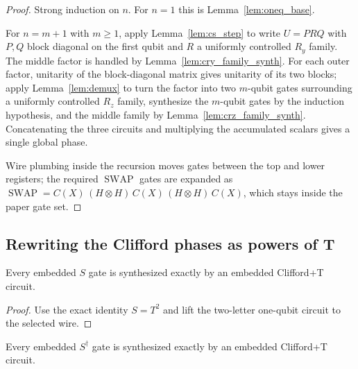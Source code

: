 \begin{proof}
  \leanok
  Strong induction on $n$.  For $n = 1$ this is Lemma~\ref{lem:oneq_base}.

  For $n = m+1$ with $m \ge 1$, apply Lemma~\ref{lem:cs_step} to write
  $U = PRQ$ with $P, Q$ block diagonal on the first qubit and $R$ a uniformly
  controlled $R_y$ family.  The middle factor is handled by
  Lemma~\ref{lem:cry_family_synth}.  For each outer factor, unitarity of the
  block-diagonal matrix gives unitarity of its two blocks; apply
  Lemma~\ref{lem:demux} to turn the factor into two $m$-qubit gates
  surrounding a uniformly controlled $R_z$ family, synthesize the $m$-qubit
  gates by the induction hypothesis, and the middle family by
  Lemma~\ref{lem:crz_family_synth}.  Concatenating the three circuits and
  multiplying the accumulated scalars gives a single global phase.

  Wire plumbing inside the recursion moves gates between the top and lower
  registers; the required $\operatorname{SWAP}$ gates are expanded as
  $\operatorname{SWAP} = C(X)\,(H\otimes H)\,C(X)\,(H\otimes H)\,C(X)$, which
  stays inside the paper gate set.
\end{proof}

\subsection{Rewriting the Clifford phases as powers of T}

\begin{proposition}
  \label{prop:embedded_s}
  \leanok
  Every embedded $S$ gate is synthesized exactly by an embedded Clifford+T
  circuit.
\end{proposition}

\begin{proof}
  \leanok
  Use the exact identity $S = T^2$ and lift the two-letter one-qubit circuit to
  the selected wire.
\end{proof}

\begin{proposition}
  \label{prop:embedded_sdag}
  \leanok
  Every embedded $S^\dagger$ gate is synthesized exactly by an embedded
  Clifford+T circuit.
\end{proposition}


